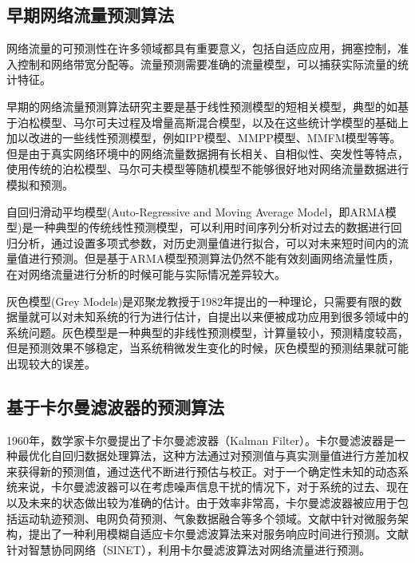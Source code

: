 \subsection{早期网络流量预测算法}

网络流量的可预测性在许多领域都具有重要意义，包括自适应应用，拥塞控制，准入控制和网络带宽分配等。流量预测需要准确的流量模型，可以捕获实际流量的统计特征\cite{feng2005study}。

早期的网络流量预测算法研究主要是基于线性预测模型的短相关模型，典型的如基于泊松模型、马尔可夫过程及增量高斯混合模型，以及在这些统计学模型的基础上加以改进的一些线性预测模型，例如IPP模型、MMPP模型、MMFM模型等等\cite{2013基于时间相关的网络流量建模与预测研究}。但是由于真实网络环境中的网络流量数据拥有长相关、自相似性、突发性等特点，使用传统的泊松模型、马尔可夫模型等随机模型不能够很好地对网络流量数据进行模拟和预测\cite{段智彬2009基于}。

自回归滑动平均模型(Auto-Regressive and Moving Average Model，即ARMA模型)是一种典型的传统线性预测模型，可以利用时间序列分析对过去的数据进行回归分析，通过设置多项式参数，对历史测量值进行拟合，可以对未来短时间内的流量值进行预测\cite{段智彬2009基于,陈广居2017网络流量预测,林义勇2017ARMA}。但是基于ARMA模型预测算法仍然不能有效刻画网络流量性质，在对网络流量进行分析的时候可能与实际情况差异较大\cite{2013基于时间相关的网络流量建模与预测研究}。

灰色模型(Grey Models)是邓聚龙教授于1982年提出的一种理论，只需要有限的数据量就可以对未知系统的行为进行估计，自提出以来便被成功应用到很多领域中的系统问题\cite{kayacan2010grey}。灰色模型是一种典型的非线性预测模型，计算量较小，预测精度较高，但是预测效果不够稳定，当系统稍微发生变化的时候，灰色模型的预测结果就可能出现较大的误差\cite{陈广居2017网络流量预测}。

\subsection{基于卡尔曼滤波器的预测算法}

1960年，数学家卡尔曼提出了卡尔曼滤波器（Kalman Filter）\cite{kalman1960new}。卡尔曼滤波器是一种最优化自回归数据处理算法，这种方法通过对预测值与真实测量值进行方差加权来获得新的预测值，通过迭代不断进行预估与校正\cite{彭丁聪2009卡尔曼滤波的基本原理及应用}。对于一个确定性未知的动态系统来说，卡尔曼滤波器可以在考虑噪声信息干扰的情况下，对于系统的过去、现在以及未来的状态做出较为准确的估计\cite{muruganantham2016evolutionary}。由于效率非常高，卡尔曼滤波器被应用于包括运动轨迹预测\cite{成光2006基于卡尔曼滤波的目标估计和预测方法研究}、电网负荷预测\cite{刘鑫2019基于改进卡尔曼滤波算法的短期负荷预测}、气象数据融合\cite{周艳青2018基于改进的卡尔曼滤波算法的气象数据融合}等多个领域。文献\cite{郝庭毅2017面向微服务架构的容器级弹性资源供给方法}中针对微服务架构，提出了一种利用模糊自适应卡尔曼滤波算法来对服务响应时间进行预测。文献\cite{贾濡2018基于卡尔曼滤波的流量预测机制}针对智慧协同网络（SINET），利用卡尔曼滤波算法对网络流量进行预测。

